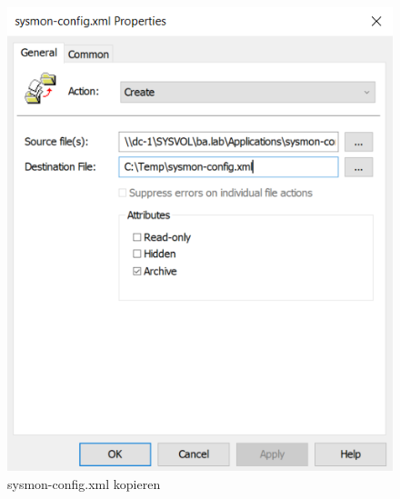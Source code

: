 \begin{minipage}{0.5\linewidth}
    \begin{figure}[H]
        \centering
        \includegraphics[width=\linewidth]{../img/sysmon/config-file.png}
        \caption{sysmon-config.xml kopieren}
    \end{figure}
\end{minipage}

